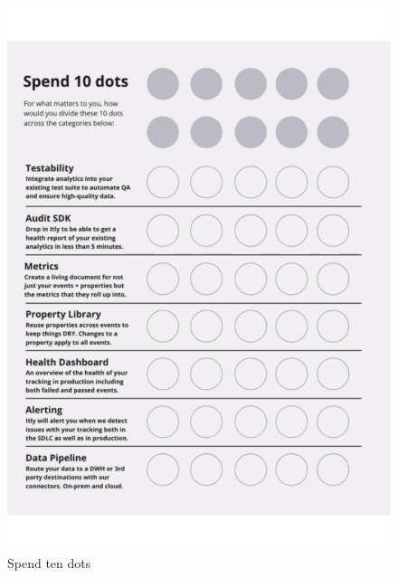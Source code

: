 \begin{figure}
\begin{minipage}{.47\linewidth}%
  \centering
  \includegraphics[width=\linewidth]{images/iteratively/spend-10-dots.pdf}
  {\footnotesize Spend ten dots}
  \label{fig:iteratively-spend-ten-dots}
\end{minipage}\hfill%
\begin{minipage}{.47\linewidth}%
  \centering

\end{minipage}
\end{figure}
